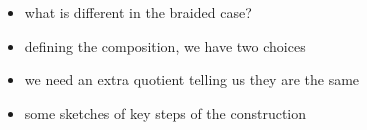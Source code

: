 \begin{itemize}
	\item what is different in the braided case?
	\item defining the composition, we have two choices
	\item we need an extra quotient telling us they are the same
	\item some sketches of key steps of the construction
\end{itemize}

